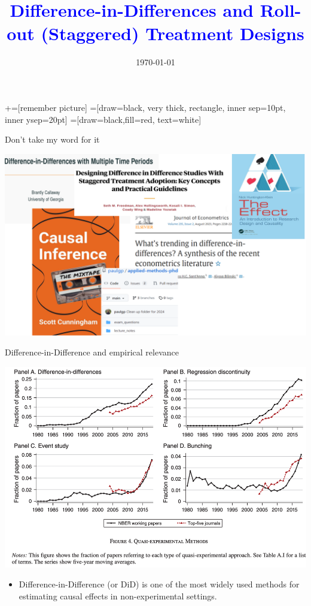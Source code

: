 \documentclass[notes,11pt, aspectratio=169]{beamer}
\title[]{\textcolor{blue}{Difference-in-Differences and Roll-out (Staggered) Treatment Designs}}
\author[DH]{}
\institute[Ratio]{\small{\begin{tabular}{c}
  Daniel Halvarsson  \\
\end{tabular}}}
\date{\today}
\begin{document}
\newcommand\marktopleft[1]{%
    \tikz[overlay,remember picture] 
        \node (marker-#1-a) at (-.3em,.3em) {};%
}
\newcommand\markbottomright[2]{%
    \tikz[overlay,remember picture] 
        \node (marker-#1-b) at (0em,0em) {};%
}
+=[remember picture] 
 =[draw=black, very thick, rectangle, inner sep=10pt, inner ysep=20pt]
 =[draw=black,fill=red, text=white]

\begin{frame}
\maketitle
\end{frame}

\begin{frame}{Don't take my word for it}
    \begin{center}
        \includegraphics[width=0.9\linewidth]{Ref.png}
    \end{center}
\end{frame}

\begin{frame}{Difference-in-Difference and empirical relevance}
    \begin{center}
        \includegraphics[width=0.6\linewidth]{AEA.png}
    \end{center}
    \begin{itemize}
        \item Difference-in-Difference (or DiD) is one of the most widely used methods for estimating causal effects in non-experimental settings. 
    \end{itemize}
    \end{frame}
\end{document}
